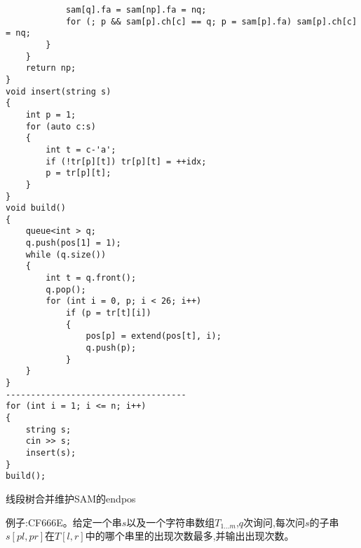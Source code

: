 \documentclass[a4paper, fontset=none]{ctexart}
\begin{document}
\begin{verbatim}
            sam[q].fa = sam[np].fa = nq;
            for (; p && sam[p].ch[c] == q; p = sam[p].fa) sam[p].ch[c] = nq;
        }
    }
    return np;
}
void insert(string s)
{
    int p = 1;
    for (auto c:s)
    {
        int t = c-'a';
        if (!tr[p][t]) tr[p][t] = ++idx;
        p = tr[p][t];
    }
}
void build()
{
    queue<int > q;
    q.push(pos[1] = 1);
    while (q.size())
    {
        int t = q.front();
        q.pop();
        for (int i = 0, p; i < 26; i++)
            if (p = tr[t][i])
            {
                pos[p] = extend(pos[t], i);
                q.push(p);
            }
    }
}
------------------------------------
for (int i = 1; i <= n; i++)
{
    string s;
    cin >> s;
    insert(s);
}
build();
\end{verbatim}

线段树合并维护SAM的endpos

例子:CF666E。给定一个串$s$以及一个字符串数组$T_{1...m}$,$q$次询问,每次问$s$的子串$s[pl, pr]$在$T[l, r]$中的哪个串里的出现次数最多,并输出出现次数。
\end{document}
